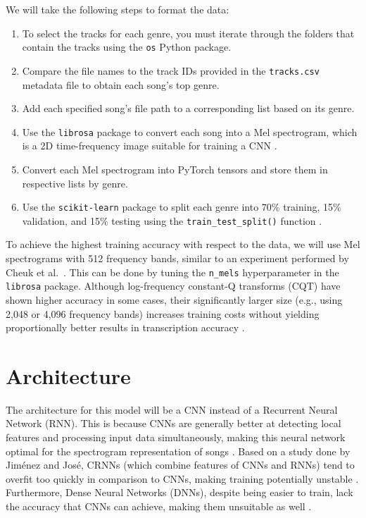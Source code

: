 \documentclass{article} %
\begin{document}
We will take the following steps to format the data:

\begin{enumerate}
    \item To select the tracks for each genre, you must iterate through the folders that contain the tracks using the \texttt{os} Python package.
    \item Compare the file names to the track IDs provided in the \texttt{tracks.csv} metadata file to obtain each song’s top genre.
    \item Add each specified song’s file path to a corresponding list based on its genre. 
    \item Use the \texttt{librosa} package to convert each song into a Mel spectrogram, which is a 2D time-frequency image suitable for training a CNN \citep{doshi_mel_spectrogram}.
    \item Convert each Mel spectrogram into PyTorch tensors and store them in respective lists by genre.
    \item Use the \texttt{scikit-learn} package to split each genre into 70\% training, 15\% validation, and 15\% testing using the \texttt{train\_test\_split()} function \citep{buhl_split}.
\end{enumerate}

To achieve the highest training accuracy with respect to the data, we will use Mel spectrograms with 512 frequency bands, similar to an experiment performed by Cheuk et al.\ \citep{cheuk2020impactaudioinputrepresentations}. This can be done by tuning the \texttt{n\_mels} hyperparameter in the \texttt{librosa} package. Although log-frequency constant-Q transforms (CQT) have shown higher accuracy in some cases, their significantly larger size (e.g., using 2,048 or 4,096 frequency bands) increases training costs without yielding proportionally better results in transcription accuracy \citep{cheuk2020impactaudioinputrepresentations}.


\section{Architecture}

The architecture for this model will be a CNN instead of a Recurrent Neural Network (RNN). This is because CNNs are generally better at detecting local features and processing input data simultaneously, making this neural network optimal for the spectrogram representation of songs \citep{kalra2023cnn_imageclass}. Based on a study done by Jiménez and José, CRNNs (which combine features of CNNs and RNNs) tend to overfit too quickly in comparison to CNNs, making training potentially unstable \citep{jimenez2020genre}. Furthermore, Dense Neural Networks (DNNs), despite being easier to train, lack the accuracy that CNNs can achieve, making them unsuitable as well \citep{landschoot2020github}.
\end{document}
